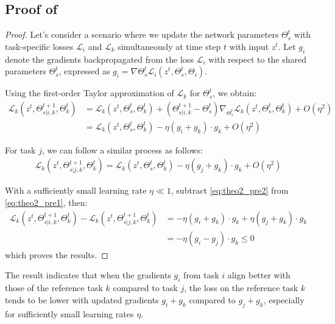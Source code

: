 \subsection{Proof of }
\label{Append:theorem2}

\theomtwo*
\begin{proof}
Let's consider a scenario where we update the network parameters $\Theta_s^t$ with task-specific losses $\mathcal{L}_i$ and $\mathcal{L}_k$ simultaneously at time step $t$ with input $z^t$. Let $g_i$ denote the gradients backpropagated from the loss $\mathcal{L}_i$ with respect to the shared parameters $\Theta_s^t$, expressed as $g_i = \nabla{\Theta_s^t} \mathcal{L}_i (z^t, \Theta_s^t, \Theta_i)$.

Using the first-order Taylor approximation of $\mathcal{L}_k$ for $\Theta_s^t$, we obtain:
\begin{align}
    \mathcal{L}_k (z^t, \Theta_{s|i,k}^{t+1}, \Theta_k^t) &= \mathcal{L}_k (z^t, \Theta_s^t, \Theta_k^t) + (\Theta_{s|i,k}^{t+1} - \Theta_s^t) \nabla_{\Theta_s^t} \mathcal{L}_k (z^t, \Theta_s^t, \Theta_k^t) + O(\eta^2)\\
    &= \mathcal{L}_k (z^t, \Theta_s^t, \Theta_k^t) - \eta (g_i + g_k)\cdot g_k + O(\eta^2)
    \label{eq:theo2_pre1}
\end{align}

For task $j$, we can follow a similar process as follows:
\begin{align}
    \mathcal{L}_k (z^t, \Theta_{s|j,k}^{t+1}, \Theta_k^t) = \mathcal{L}_k (z^t, \Theta_s^t, \Theta_k^t) - \eta (g_j + g_k)\cdot g_k + O(\eta^2)
    \label{eq:theo2_pre2}
\end{align}

With a sufficiently small learning rate $\eta \ll 1$, subtract \cref{eq:theo2_pre2} from \cref{eq:theo2_pre1}, then:
\begin{align}
    \mathcal{L}_k (z^t, \Theta_{s|i,k}^{t+1}, \Theta_k^t) - \mathcal{L}_k (z^t, \Theta_{s|j,k}^{t+1}, \Theta_k^t) &= - \eta (g_i + g_k)\cdot g_k + \eta (g_j + g_k)\cdot g_k \\
    &= - \eta(g_i-g_j)\cdot g_k \leq 0
    \label{eq:theo2_result}
\end{align}
which proves the results.
\end{proof}

The result indicates that when the gradients $g_i$ from task $i$ align better with those of the reference task $k$ compared to task $j$, the loss on the reference task $k$ tends to be lower with updated gradients $g_i + g_k$ compared to $g_j + g_k$, especially for sufficiently small learning rates $\eta$. 




